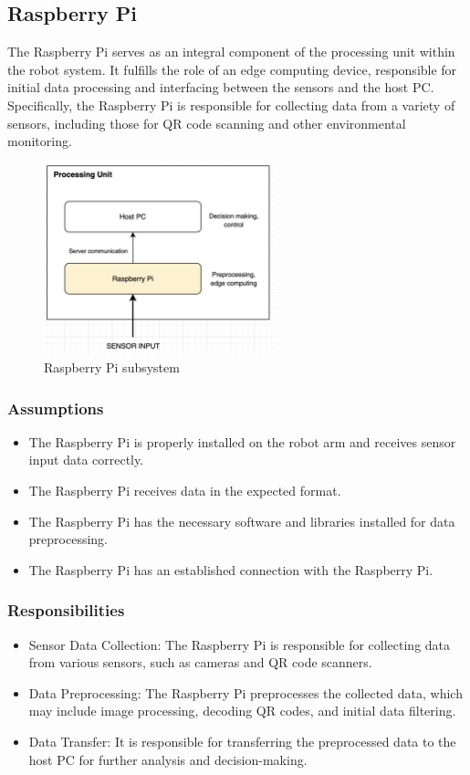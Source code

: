 \subsection{Raspberry Pi}
The Raspberry Pi serves as an integral component of the processing unit within the robot system. It fulfills the role of an edge computing device, responsible for initial data processing and interfacing between the sensors and the host PC. Specifically, the Raspberry Pi is responsible for collecting data from a variety of sensors, including those for QR code scanning and other environmental monitoring.
\begin{figure}[h!]
	\centering
 	\includegraphics[width=0.60\textwidth]{images/rpi.png}
 \caption{Raspberry Pi subsystem}
\end{figure}

\subsubsection{Assumptions}
\begin{itemize}
    \item The Raspberry Pi is properly installed on the robot arm and receives sensor input data correctly.
    \item The Raspberry Pi receives data in the expected format.
    \item The Raspberry Pi has the necessary software and libraries installed for data preprocessing.
    \item The Raspberry Pi has an established connection with the Raspberry Pi.
\end{itemize}
\subsubsection{Responsibilities}
\begin{itemize}
    \item Sensor Data Collection: The Raspberry Pi is responsible for collecting data from various sensors, such as cameras and QR code scanners.
    \item Data Preprocessing: The Raspberry Pi preprocesses the collected data, which may include image processing, decoding QR codes, and initial data filtering.
    \item Data Transfer: It is responsible for transferring the preprocessed data to the host PC for further analysis and decision-making.
\end{itemize}

